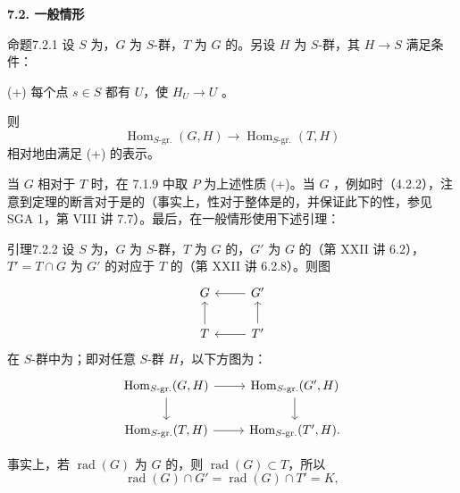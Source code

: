 \textbf{7.2. 一般情形}
\begin{SGAresult}{命题}{7.2.1}
设 $S$ 为，$G$ 为 $S$-群，$T$ 为 $G$ 的。另设 $H$ 为 $S$-群，其 $H\to S$ 满足条件：

(+) 每个点 $s\in S$ 都有 $U$，使 $H_U\to U$ 。

则
\[\operatorname{Hom}_{S\text{-gr.}}(G,H)\longrightarrow\operatorname{Hom}_{S\text{-gr.}}(T,H)\]
相对地由满足 (+) 的表示。
\end{SGAresult}
当 $G$ 相对于 $T$ 时，在 7.1.9 中取 $P$ 为上述性质 (+)。当 $G$ ，例如时（4.2.2），注意到定理的断言对于是的（事实上，性对于整体是的，并保证此下的性，参见 SGA 1，第 VIII 讲 7.7）。最后，在一般情形使用下述引理：
\begin{SGAresult}{引理}{7.2.2}
设 $S$ 为，$G$ 为 $S$-群，$T$ 为 $G$ 的，$G'$ 为 $G$ 的（第 XXII 讲 6.2），$T'=T\cap G$ 为 $G'$ 的对应于 $T$ 的（第 XXII 讲 6.2.8）。则图
\[\begin{tikzcd}G&G'\arrow[l]\\T\arrow[u]&T'\arrow[l]\arrow[u]\end{tikzcd}\]
在 $S$-群中为；即对任意 $S$-群 $H$，以下方图为：
\[\begin{tikzcd}
\operatorname{Hom}_{S\text{-gr.}}(G,H)\arrow[r]\arrow[d]&\operatorname{Hom}_{S\text{-gr.}}(G',H)\arrow[d]\\
\operatorname{Hom}_{S\text{-gr.}}(T,H)\arrow[r]&\operatorname{Hom}_{S\text{-gr.}}(T',H).
\end{tikzcd}\]
\end{SGAresult}
事实上，若 $\operatorname{rad}(G)$ 为 $G$ 的，则 $\operatorname{rad}(G)\subset T$，所以
\[\operatorname{rad}(G)\cap G'=\operatorname{rad}(G)\cap T'=K,\]
